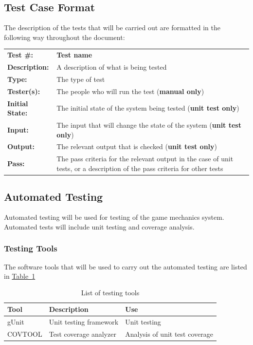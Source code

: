 \documentclass[12pt, titlepage]{article}
\begin{document}
\subsection{Test Case Format}
The description of the tests that will be carried out are formatted in the following way throughout the document: 

\begin{mdframed}[linewidth=1pt]
\begin{tabularx}{\textwidth}{@{}p{3cm}X@{}}
{\bf Test \#:} & {\bf Test name}\\[\baselineskip]
{\bf Description:} & A description of what is being tested\\[0.5\baselineskip]
{\bf Type:} & The type of test\\[0.5\baselineskip]
{\bf Tester(s):} & The people who will run the test ({\bf manual only})\\[0.5\baselineskip]
{\bf Initial State:} & The initial state of the system being tested ({\bf unit test only})\\[0.5\baselineskip]
{\bf Input:} &  The input that will change the state of the system ({\bf unit test only})\\[0.5\baselineskip]
{\bf Output:} & The relevant output that is checked ({\bf unit test only})\\[0.5\baselineskip]
{\bf Pass:} & The pass criteria for the relevant output in the case of unit tests, or a description of the pass criteria for other tests
\end{tabularx}
\end{mdframed}

\subsection{Automated Testing}
Automated testing will be used for testing of the game mechanics system.  Automated tests will include unit testing and coverage analysis.

\subsubsection{Testing Tools}
The software tools that will be used to carry out the automated testing are listed in \hyperref[tab:tools]{Table~\ref*{tab:tools}}

\begin{table}[ht]
\caption{List of testing tools} \label{tab:tools}
\begin{tabularx}{\textwidth}{p{2.3cm}p{4.5cm}X}
\toprule {\bf Tool} & {\bf Description} & {\bf Use}\\
\midrule
gUnit & Unit testing framework & Unit testing\\
COVTOOL & Test coverage analyzer & Analysis of unit test coverage\\
\bottomrule
\end{tabularx}
\end{table}
\end{document}
